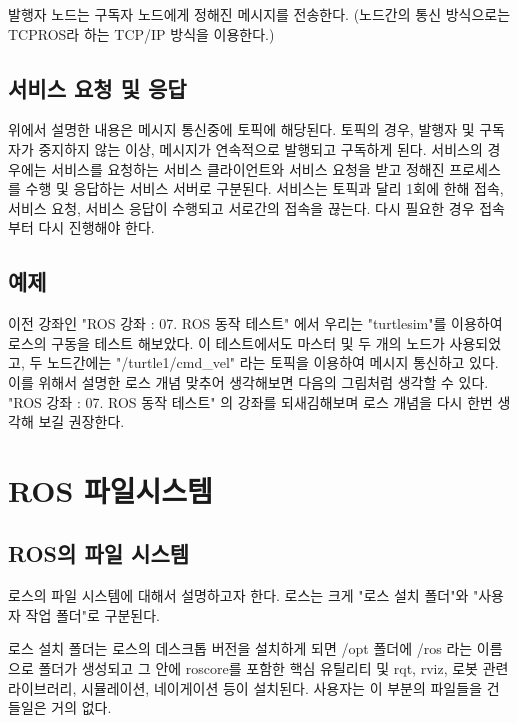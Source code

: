 발행자 노드는 구독자 노드에게 정해진 메시지를 전송한다. (노드간의 통신 방식으로는 TCPROS라 하는 TCP/IP 방식을 이용한다.)

\subsection{서비스 요청 및 응답}

위에서 설명한 내용은 메시지 통신중에 토픽에 해당된다. 토픽의 경우, 발행자 및 구독자가 중지하지 않는 이상, 메시지가 연속적으로 발행되고 구독하게 된다. 서비스의 경우에는 서비스를 요청하는 서비스 클라이언트와 서비스 요청을 받고 정해진 프로세스를 수행 및 응답하는 서비스 서버로 구분된다. 서비스는 토픽과 달리 1회에 한해 접속, 서비스 요청, 서비스 응답이 수행되고 서로간의 접속을 끊는다. 다시 필요한 경우 접속부터 다시 진행해야 한다. 

\subsection{예제}

이전 강좌인 "ROS 강좌 : 07. ROS 동작 테스트" 에서 우리는 "turtlesim"를 이용하여 로스의 구동을 테스트 해보았다. 이 테스트에서도 마스터 및 두 개의 노드가 사용되었고, 두 노드간에는 "/turtle1/cmd\_vel" 라는 토픽을 이용하여 메시지 통신하고 있다. 이를 위해서 설명한 로스 개념 맞추어 생각해보면 다음의 그림처럼 생각할 수 있다.  "ROS 강좌 : 07. ROS 동작 테스트" 의 강좌를 되새김해보며 로스 개념을 다시 한번 생각해 보길 권장한다.

\section{ROS 파일시스템}

\subsection{ROS의 파일 시스템}

로스의 파일 시스템에 대해서 설명하고자 한다. 로스는 크게 "로스 설치 폴더"와 "사용자 작업 폴더"로 구분된다. 

로스 설치 폴더는 로스의 데스크톱 버전을 설치하게 되면 /opt 폴더에 /ros 라는 이름으로 폴더가 생성되고 그 안에 roscore를 포함한 핵심 유틸리티 및 rqt, rviz, 로봇 관련 라이브러리, 시뮬레이션, 네이게이션 등이 설치된다. 사용자는 이 부분의 파일들을 건들일은 거의 없다. 

